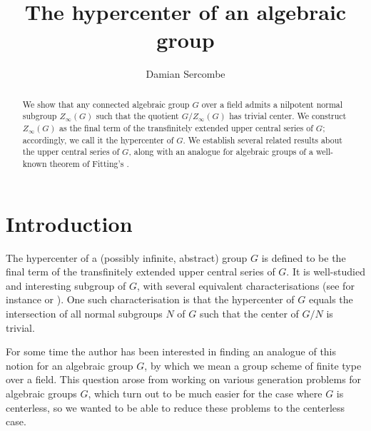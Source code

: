 \documentclass[twoside,a4paper,reqno,11pt]{amsart}
\def\thefootnote{\fnsymbol{footnote}}
\theoremstyle{definition}
\begin{document}
\title{The hypercenter of an algebraic group}
\author[D.\ Sercombe]{Damian Sercombe}
\address
{Mathematisches Institut, Universität Freiburg, Ernst-Zermelo-Straße 1, 79104 Freiburg, Germany}

\begin{abstract} We show that any connected algebraic group $G$ over a field admits a nilpotent normal subgroup $Z_\infty(G)$ such that the quotient $G/Z_\infty(G)$ has trivial center. We construct $Z_\infty(G)$ as the final term of the transfinitely extended upper central series of $G$; accordingly, we call it the hypercenter of $G$. We establish several related results about the upper central series of $G$, along with an analogue for algebraic groups of a well-known theorem of Fitting's \cite{Fi}.
\end{abstract}

\let\thefootnote\relax{}

\maketitle

\section{Introduction}\label{intro}

\noindent The hypercenter of a (possibly infinite, abstract) group $G$ is defined to be the final term of the transfinitely extended upper central series of $G$. It is well-studied and interesting subgroup of $G$, with several equivalent characterisations (see for instance \cite{Ba} or \cite[Ch.\ 1, 2]{R}). %
One such characterisation is that the hypercenter of $G$ equals the intersection of all normal subgroups $N$ of $G$ such that the center of $G/N$ is trivial.

\vspace{2mm}\noindent For some time the author has been interested in finding an analogue of this notion for an algebraic group $G$, by which we mean a group scheme of finite type over a field. This question arose from working on various generation problems for algebraic groups $G$, which turn out to be much easier for the case where $G$ is centerless, so we wanted to be able to reduce these problems to the centerless case.
\end{document}
